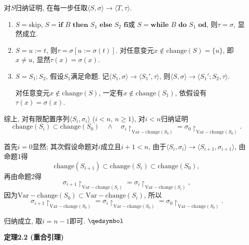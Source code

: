 \documentclass[UTF8]{ctexart}
\begin{document}
\vspace{3pt}
对$S$归纳证明, 在每一步任取$\langle S,\sigma\rangle\to\langle T,\tau\rangle$.
\begin{enumerate}
    \item $S=\mathrm{skip}$, $S=\mathbf{if}\,\,B\,\,\mathbf{then}\,\,S_1\,\,
    \mathbf{else}\,\,S_2\,\,\mathbf{fi}$或
    $S=\mathbf{while}\,\,B\,\,\mathbf{do}\,\,S_1\,\,\mathbf{od}$,
    则$\tau=\sigma$, 显然成立.

    \item $S=u:=t$, 则$\tau=\sigma[u:=\sigma(t)]$.
    对任意变元$x\notin\mathrm{change}(S)=\{u\}$, 即$x\neq u$,
    显然$\tau(x)=\sigma(x)$.

    \item $S=S_1;S_2$, 假设$S_1$满足命题. 记$\langle S_1,\sigma\rangle\to
    \langle S_1',\tau\rangle$, 则$\langle S,\sigma\rangle\to
    \langle S_1';S_2,\tau\rangle$.
    
    \hspace{2.17em}
    对任意变元$x\notin\mathrm{change}(S)$,
    一定有$x\notin\mathrm{change}(S_1)$, 依假设有$\tau(x)=\sigma(x)$.
\end{enumerate}

\vspace{5pt}

综上, 对有限配置序列$\langle S_i,\sigma_i\rangle$ ($i<n,\,n\geqslant 1$),
对$i<n$归纳证明
\[
    \mathrm{change}(S_i)\subset\mathrm{change}(S_0)\quad\land\quad
    \sigma_i\!\restriction_{\mathrm{Var}-\mathrm{change}(S_0)}=
    \sigma_0\!\restriction_{\mathrm{Var}-\mathrm{change}(S_0)}.
\]

首先$i=0$显然; 其次假设命题对$i$成立且$i+1<n$,
由于$\langle S_i,\sigma_i\rangle\to\langle S_{i+1},\sigma_{i+1}\rangle$,
由命题1得
\[
    \mathrm{change}(S_{i+1})\subset\mathrm{change}(S_i)
    \subset\mathrm{change}(S_0),
\]
再由命题2得
\[
    \sigma_{i+1}\!\restriction_{\mathrm{Var}-\mathrm{change}(S_i)}=
    \sigma_i\!\restriction_{\mathrm{Var}-\mathrm{change}(S_i)},
\]
因为$\mathrm{Var}-\mathrm{change}(S_0)\subset
\mathrm{Var}-\mathrm{change}(S_i)$, 所以
\[
    \sigma_{i+1}\!\restriction_{\mathrm{Var}-\mathrm{change}(S_0)}=
    \sigma_i\!\restriction_{\mathrm{Var}-\mathrm{change}(S_0)}=
    \sigma_0\!\restriction_{\mathrm{Var}-\mathrm{change}(S_0)}.
\]

归纳成立, 取$i=n-1$即可. \hfill $\qedsymbol$





\newpage

\hypertarget{sec:定理2.2}{}
\noindent\textbf{定理2.2 (重合引理)}
\end{document}
